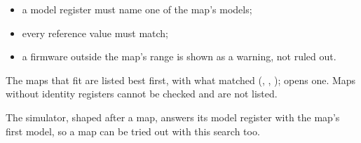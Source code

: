 \begin{itemize}
  \item a model register must name one of the map's models;
  \item every reference value must match;
  \item a firmware outside the map's range is shown as a warning, not ruled out.
\end{itemize}

The maps that fit are listed best first, with what matched (,
, );  opens one. Maps without
identity registers cannot be checked and are not listed.

The simulator, shaped after a map, answers its model register with the map's
first model, so a map can be tried out with this search too.
